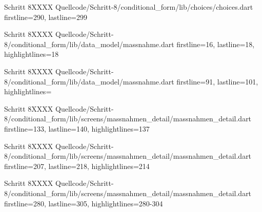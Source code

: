   \begin{alexlisting}{Schritt 8}{XXXX}
    {Quellcode/Schritt-8/conditional_form/lib/choices/choices.dart}
    {firstline=290, lastline=299}
    \label{lst:Schritt8XXXX}
  \end{alexlisting}


  \begin{alexlisting}{Schritt 8}{XXXX}
    {Quellcode/Schritt-8/conditional_form/lib/data_model/massnahme.dart}
    {firstline=16, lastline=18, highlightlines={18}}
    \label{lst:Schritt8XXXX}
  \end{alexlisting}

  \begin{alexlisting}{Schritt 8}{XXXX}
    {Quellcode/Schritt-8/conditional_form/lib/data_model/massnahme.dart}
    {firstline=91, lastline=101, highlightlines={}}
    \label{lst:Schritt8XXXX}
  \end{alexlisting}

  \begin{alexlisting}{Schritt 8}{XXXX}
    {Quellcode/Schritt-8/conditional_form/lib/screens/massnahmen_detail/massnahmen_detail.dart}
    {firstline=133, lastline=140, highlightlines={137}}
    \label{lst:Schritt6XXXXX}
  \end{alexlisting}

  \begin{alexlisting}{Schritt 8}{XXXX}
    {Quellcode/Schritt-8/conditional_form/lib/screens/massnahmen_detail/massnahmen_detail.dart}
    {firstline=207, lastline=218, highlightlines={214}}
    \label{lst:Schritt6XXXXX}
  \end{alexlisting}

  \begin{alexlisting}{Schritt 8}{XXXX}
    {Quellcode/Schritt-8/conditional_form/lib/screens/massnahmen_detail/massnahmen_detail.dart}
    {firstline=280, lastline=305, highlightlines={280-304}}
    \label{lst:Schritt6XXXXX}
  \end{alexlisting}



